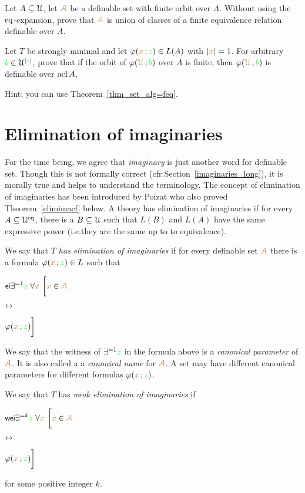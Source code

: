 \documentclass[creche.tex]{subfiles}
\begin{document}
\begin{exercise}\label{ex_feqthm_senza_eq}
Let $A\subseteq\EuScript U$, let ${\color{brown}\EuScript A}$ be a definable set with finite orbit over $A$.
Without using the ${{\rm eq}}$-expansion, prove that ${\color{brown}\EuScript A}$ is union of classes of a finite equivalence relation definable over $A$.\QED
\end{exercise}

\begin{exercise}
Let $T$ be strongly minimal and let $\varphi({\color{brown} x}\,;{\color{green} z})\in L(A)$ with $|{\color{brown} x}|=1$.
For arbitrary ${\color{green} b}\in\EuScript U^{|{\color{green} z}|}$, prove that if the orbit of $\varphi({\color{brown}\EuScript U}\,; {\color{green} b})$ over $A$ is finite, then $\varphi({\color{brown}\EuScript U}\,; {\color{green} b})$ is definable over $\mathop{\rm acl} A$.

Hint: you can use Theorem~\ref{thm_set_alg=feq}.\QED
\end{exercise}


\section{Elimination of imaginaries}\label{elimination_imaginaries}

\def\medrel#1{\parbox[t]{5ex}{$\displaystyle\hfil #1$}}
\def\ceq#1#2#3{\parbox[t]{30ex}{$\displaystyle #1$}\medrel{#2}{$\displaystyle #3$}}

For the time being, we agree that \textit{imaginary\/} is just another word for definable set.
Though this is not formally correct (cfr.\@ Section~\ref{imaginaries_long}), it is morally true and helps to understand the terminology.
The concept of elimination of imaginaries has been introduced by Poizat who also proved Theorem~\ref{elimimacf} below.
A theory has elimination of imaginaries if for every $A\subseteq\EuScript U^{{\rm eq}}$, there is a $B\subseteq\EuScript U$ such that $L(B)$ and $L(A)$ have the same expressive power (i.e.\@ they are the same up to to equivalence).


\begin{definition}\label{defelimanazioneimmaginari}
We say that \emph{$T$ has elimination of imaginaries\/} if for every definable set ${\color{brown}\EuScript A}$ there is a formula $\varphi({\color{brown} x}\,;{\color{green} z})\in L$ such that\smallskip

\ceq{\ssf{ei}\hfill\E^{=1} {\gr z}\;\A {\mr x}\ \bigg[{\mr x}\in{\vl\Aa}}{\iff}{\phi({\mr x}\,;{\gr z})\bigg]}

We say that the witness of $\exists^{=1}{\color{green} z}$ in the formula above is a \emph{canonical parameter\/} of ${\color{brown}\EuScript A}$.
It is also called a a \emph{canonical name\/} for ${\color{brown}\EuScript A}$.
A set may have different canonical parameters for different formulas $\varphi({\color{brown} x}\,;{\color{green} z})$.

We say that $T$ has \emph{weak elimination of imaginaries\/} if\smallskip

\ceq{\ssf{wei}\hfill\E^{=k} {\gr z}\;\A {\mr x}\ \bigg[{\mr x}\in{\vl\Aa}}{\iff}{\phi({\mr x}\,;{\gr z})\bigg]}

for some positive integer $k$.\QED
\end{definition}
\end{document}
